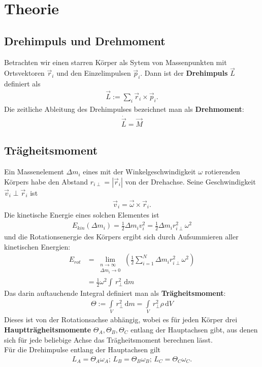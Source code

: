\section{Theorie}
\subsection{Drehimpuls und Drehmoment}
Betrachten wir einen starren Körper als Sytem von Massenpunkten mit Ortsvektoren $\vec{r}_i$ und den Einzelimpulsen $\vec{p}_i$. Dann ist der \textbf{Drehimpuls} $\vec{L}$ definiert als
\begin{align}
\vec{L}:=\sum\limits_{i}\vec{r}_i\times\vec{p}_i.
\end{align}
Die zeitliche Ableitung des Drehimpulses bezeichnet man als \textbf{Drehmoment}:
\begin{align}
\dot{\vec{L}}=\vec{M}
\end{align}
\subsection{Trägheitsmoment}
Ein Massenelement $\Delta{m_i}$ eines mit der Winkelgeschwindigkeit $\omega$ rotierenden Körpers habe den Abstand $r_{i\perp}=\left|\vec{r}_i\right|$ von der Drehachse. Seine Geschwindigkeit $\vec{v}_i\perp\vec{r}_i$ ist
\begin{align}
\vec{v}_i=\vec{\omega}\times\vec{r}_i.
\end{align}
Die kinetische Energie eines solchen Elementes ist
\begin{align}
E_{kin}\left(\Delta{m_i}\right)=\frac{1}{2}\Delta{m_i}v^2_i=\frac{1}{2}\Delta{m_i}r^2_{i\perp}\omega^2
\end{align}
und die Rotationsenergie des Körpers ergibt sich durch Aufsummieren aller kinetischen Energien:
\begin{align}
E_{rot}&=\lim\limits_{\substack{n\to\infty\\\Delta{m_i}\to0}}\left(\frac{1}{2}\sum\limits_{i=1}^{N}\Delta{m_i}r^2_{i\perp}\omega^2\right)\nonumber\\
&=\frac{1}{2}\omega^2\int \, r^2_{\perp}\, \mathrm{d}m
\end{align}
Das darin auftauchende Integral definiert man als \textbf{Trägheitsmoment}:
\begin{align}
\Theta:=\int\limits_{V} \, r^2_{\perp}\, \mathrm{d}m=\int\limits_{V} \, r^2_{\perp}\rho\, \mathrm{d}V
\end{align}
Dieses ist von der Rotationsachse abhängig, wobei es für jeden Körper drei \textbf{Hauptträgheitsmomente} $\Theta_A, \Theta_B, \Theta_C$ entlang der Hauptachsen gibt, aus denen sich für jede beliebige Achse das Trägheitsmoment berechnen lässt.\\
Für die Drehimpulse entlang der Hauptachsen gilt
\begin{align}
L_A=\Theta_A\omega_A; \, L_B=\Theta_B\omega_B; \, L_C=\Theta_C\omega_C.
\end{align}
